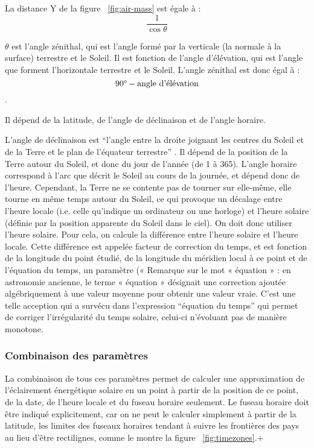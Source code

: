 \documentclass[12pt]{article}
\begin{document}
La distance Y de la figure ~\ref{fig:air-mass} est égale à : \[\frac{1 }{\cos \theta}\]

$\theta$ est l'angle zénithal, qui est l'angle formé par la verticale (la normale à la surface) terrestre et le Soleil. Il est fonction de l'angle d'élévation, qui est l'angle que forment l'horizontale terrestre et le Soleil. L'angle zénithal est donc égal à : \[90\degree - \textrm{angle d'élévation}\].


Il dépend de la latitude, de l'angle de déclinaison et de l'angle horaire.
      
L'angle de déclinaison est ``l'angle entre la droite joignant les centres du Soleil et de la Terre et le plan de l'équateur terrestre'' \cite{mouvement_terre}. Il dépend de la position de la Terre autour du Soleil, et donc du jour de l'année (de 1 à 365).
L'angle horaire correspond à l'arc que décrit le Soleil au cours de la journée, et dépend donc de l'heure. Cependant, la Terre ne se contente pas de tourner sur elle-même, elle tourne en même temps autour du Soleil, ce qui provoque un décalage entre l'heure locale (i.e. celle qu'indique un ordinateur ou une horloge) et l'heure solaire (définie par la position apparente du Soleil dans le ciel). On doit donc utiliser l'heure solaire.
Pour cela, on calcule la différence entre l'heure solaire et l'heure locale. Cette différence est appelée facteur de correction du temps, et est fonction de la longitude du point étudié, de la longitude du méridien local à ce point et de l'équation du temps, un paramètre (« Remarque sur le mot « équation » : en astronomie ancienne, le terme « équation » désignait une correction ajoutée algébriquement à une valeur moyenne pour obtenir une valeur vraie. C'est une telle acception qui a survécu dans l'expression ``équation du temps'' \cite{equation_temps_wiki} qui permet de corriger l'irrégularité du temps solaire, celui-ci n'évoluant pas de manière monotone. %


\subsubsection{Combinaison des paramètres}
La combinaison de tous ces paramètres permet de calculer une approximation de l'éclairement énergétique solaire en un point à partir de la position de ce point, de la date, de l'heure locale et du fuseau horaire seulement. Le fuseau horaire doit être indiqué explicitement, car on ne peut le calculer simplement à partir de la latitude, les limites des fuseaux horaires tendant à suivre les frontières des pays au lieu d'être rectilignes, comme le montre la figure ~\ref{fig:timezones}.+
\end{document}
